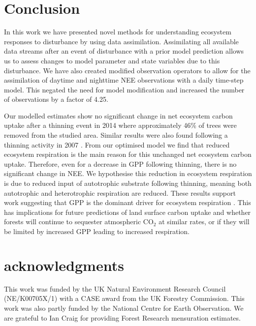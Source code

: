 
\section{Conclusion}

In this work we have presented novel methods for understanding ecosystem responses to disturbance by using data assimilation. Assimilating all available data streams after an event of disturbance with a prior model prediction allows us to assess changes to model parameter and state variables due to this disturbance. We have also created modified observation operators to allow for the assimilation of daytime and nighttime NEE observations with a daily time-step model. This negated the need for model modification and increased the number of observations by a factor of 4.25.

Our modelled estimates show no significant change in net ecosystem carbon uptake after a thinning event in 2014 where approximately 46\% of trees were removed from the studied area. Similar results were also found following a thinning activity in 2007 \citep{wilkinson2016}. From our optimised model we find that reduced ecosystem respiration is the main reason for this unchanged net ecosystem carbon uptake. Therefore, even for a decrease in GPP following thinning, there is no significant change in NEE. We hypothesise this reduction in ecosystem respiration is due to reduced input of autotrophic substrate following thinning, meaning both autotrophic and heterotrophic respiration are reduced. These results support work suggesting that GPP is the dominant driver for ecosystem respiration  \citep{GCB:GCB412, PCE:PCE1053, hogberg2006towards, heinemeyer2012exploring, ELE:ELE12097}. This has implications for future predictions of land surface carbon uptake and whether forests will continue to sequester atmospheric CO\(_{2}\) at similar rates, or if they will be limited by increased GPP leading to increased respiration. 

\section{acknowledgments}
This work was funded by the UK Natural Environment Research Council (NE/K00705X/1) with a CASE award from the UK Forestry Commission. This work was also partly funded by the National Centre for Earth Observation. We are grateful to Ian Craig for providing Forest Research mensuration estimates.

